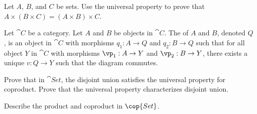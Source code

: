 \documentclass[10pt]{article}
\begin{document}
\begin{problem}
    Let $A$, $B$, and $C$ be sets. Use the universal property to prove that $A\times(B\times C)=(A\times B)\times C$.
\end{problem}
\begin{definition}
    Let $\cat{C}$ be a category. Let $A$ and $B$ be objects in $\cat{C}$. The  of $A$ and $B$, denoted $Q$, is an object in $\cat{C}$ with morphisms ${q}_{1}:A\to Q$ and ${q}_{2}:B\to Q$ such that for all object $Y$ in $\cat{C}$ with morphisms ${\vp}_{1}:A\to Y$ and ${\vp}_{2}:B\to Y$, there exists a unique $v:Q\to Y$ such that the diagram commutes.
\end{definition}
\begin{center}
\end{center}
\begin{problem}
    Prove that in $\cat{Set}$, the disjoint union satisfies the universal property for coproduct. Prove that the universal property characterizes disjoint union.
\end{problem}
\begin{problem}
    Describe the product and coproduct in $\cop{Set}$. 
\end{problem}
\end{document}
